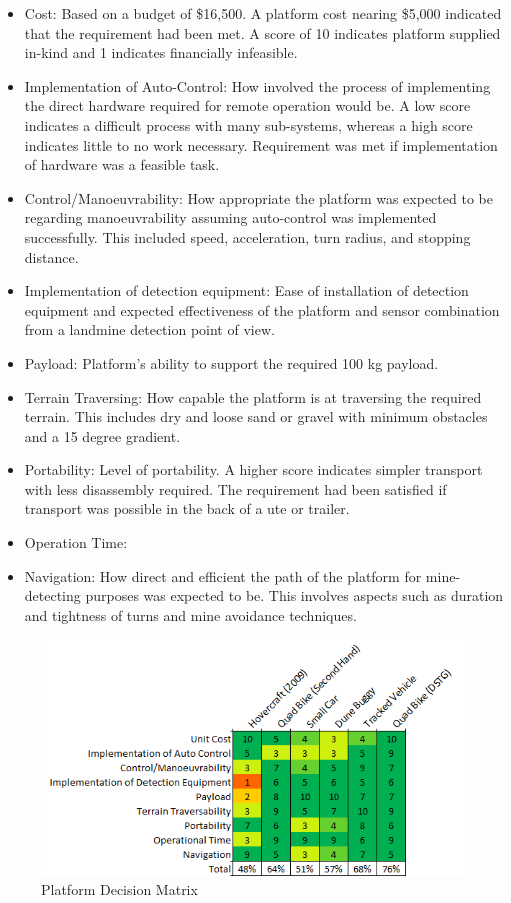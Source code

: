 \documentclass[main.tex]{subfiles}
\begin{document}
\begin{itemize}
\item Cost: Based on a budget of \$16,500. A platform cost nearing \$5,000 indicated that the requirement had been met. A score of 10 indicates platform supplied in-kind and 1 indicates financially infeasible.
\item Implementation of Auto-Control: How involved the process of implementing the direct hardware required for remote operation would be. A low score indicates a difficult process with many sub-systems, whereas a high score indicates little to no work necessary. Requirement was met if implementation of hardware was a feasible task.
\item Control/Manoeuvrability: How appropriate the platform was expected to be regarding manoeuvrability assuming auto-control was implemented successfully. This included speed, acceleration, turn radius, and stopping distance.
\item Implementation of detection equipment: Ease of installation of detection equipment and expected effectiveness of the platform and sensor combination from a landmine detection point of view.
\item Payload: Platform's ability to support the required 100 kg payload.
\item Terrain Traversing: How capable the platform is at traversing the required terrain. This includes dry and loose sand or gravel with minimum obstacles and a 15 degree gradient.
\item Portability: Level of portability. A higher score indicates simpler transport with less disassembly required. The requirement had been satisfied if transport was possible in the back of a ute or trailer.
\item Operation Time: {\color{red}{need something here, i dont think theres anything in requirements for it yet}}
\item Navigation: How direct and efficient the path of the platform for mine-detecting purposes was expected to be. This involves aspects such as duration and tightness of turns and mine avoidance techniques.
\end{itemize}

\begin{figure}[ht]
\includegraphics{4-ConceptDesign/platformDecision.png}
\centering
\caption{Platform Decision Matrix} 
\end{figure}
\end{document}
